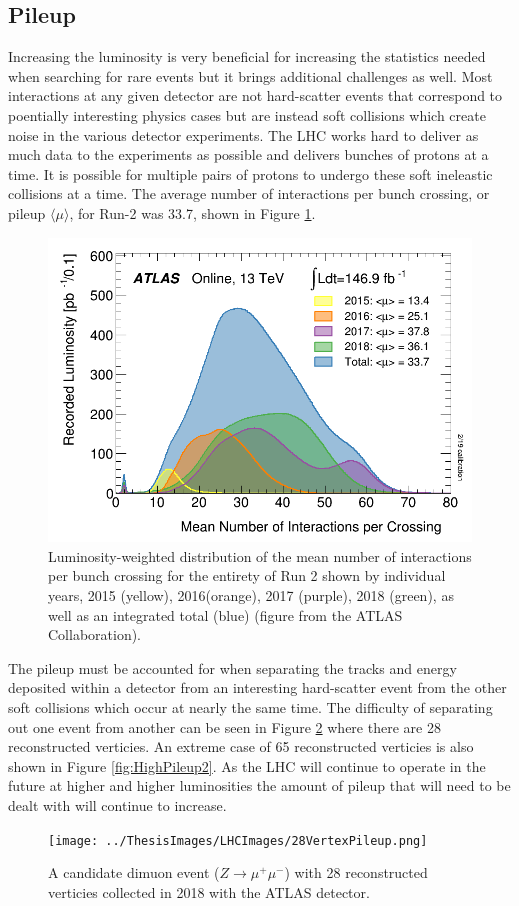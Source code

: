 \subsection{Pileup}

Increasing the luminosity is very beneficial for increasing the statistics needed when searching for rare events but it brings additional challenges as well.  Most interactions at any given detector are not hard-scatter events that correspond to poentially interesting physics cases but are instead soft collisions which create noise in the various detector experiments.  The LHC works hard to deliver as much data to the experiments as possible and delivers bunches of protons at a time.  It is possible for multiple pairs of protons to undergo these soft ineleastic collisions at a time.  The average number of interactions per bunch crossing, or pileup $\langle{\mu}\rangle$, for Run-2 was 33.7, shown in Figure \ref{fig:ATLASmeanIntperCrossing}. 
\begin{figure}[h!]
	\centering
	\includegraphics[width=.7\columnwidth]{../ThesisImages/LHCImages/meanIntperCrossing.png}
	\caption{Luminosity-weighted distribution of the mean number of interactions per bunch crossing for the entirety of Run 2 shown by individual years, 2015 (yellow), 2016(orange), 2017 (purple), 2018 (green), as well as an integrated total (blue) (figure from the ATLAS Collaboration).
	}
	\label{fig:ATLASmeanIntperCrossing}
\end{figure}
 The pileup must be accounted for when separating the tracks and energy deposited within a detector from an interesting hard-scatter event from the other soft collisions which occur at nearly the same time.  The difficulty of separating out one event from another can be seen in Figure \ref{fig:HighPileup} where there are 28 reconstructed verticies.  An extreme case of 65 reconstructed verticies is also shown in Figure \ref{fig:HighPileup2}.  As the LHC will continue to operate in the future at higher and higher luminosities the amount of pileup that will need to be dealt with will continue to increase.  
\begin{figure}[h!]
	\centering
	\texttt{[image: ../ThesisImages/LHCImages/28VertexPileup.png]}
	\caption{ A candidate dimuon event ($Z\rightarrow \mu^+ \mu^-$) with 28 reconstructed verticies collected in 2018 with the ATLAS detector.
	}
	\label{fig:HighPileup}
\end{figure}

